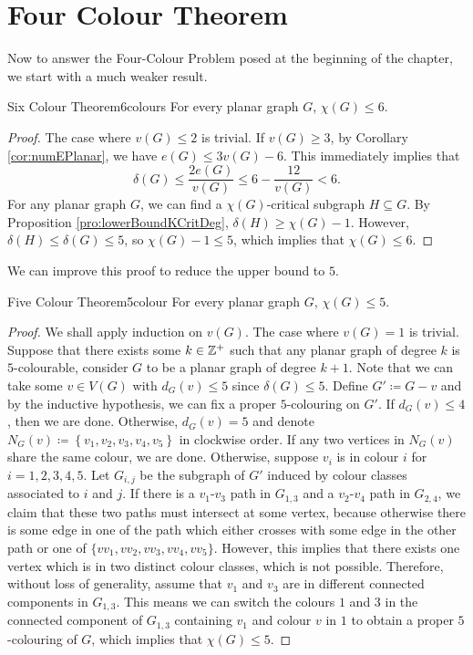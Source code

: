 \documentclass[math, code]{amznotes}
\theoremstyle{remark}
\begin{document}
\section{Four Colour Theorem}
Now to answer the Four-Colour Problem posed at the beginning of the chapter, we start with a much weaker result.
\begin{thmbox}{Six Colour Theorem}{6colours}
    For every planar graph $G$, $\chi(G) \leq 6$.
    \tcblower
    \begin{proof}
        The case where $v(G) \leq 2$ is trivial. If $v(G) \geq 3$, by Corollary \ref{cor:numEPlanar}, we have $e(G) \leq 3v(G) - 6$. This immediately implies that 
        \begin{equation*}
            \delta(G) \leq \frac{2e(G)}{v(G)} \leq 6 - \frac{12}{v(G)} < 6.
        \end{equation*}
        For any planar graph $G$, we can find a $\chi(G)$-critical subgraph $H \subseteq G$. By Proposition \ref{pro:lowerBoundKCritDeg}, $\delta(H) \geq \chi(G) - 1$. However, $\delta(H) \leq \delta(G) \leq 5$, so $\chi(G) - 1 \leq 5$, which implies that $\chi(G) \leq 6$.
    \end{proof}
\end{thmbox}
We can improve this proof to reduce the upper bound to $5$.
\begin{thmbox}{Five Colour Theorem}{5colour}
    For every planar graph $G$, $\chi(G) \leq 5$.
    \tcblower
    \begin{proof}
        We shall apply induction on $v(G)$. The case where $v(G) = 1$ is trivial. Suppose that there exists some $k \in \mathbb{Z}^+$ such that any planar graph of degree $k$ is $5$-colourable, consider $G$ to be a planar graph of degree $k + 1$. Note that we can take some $v \in V(G)$ with $d_G(v) \leq 5$ since $\delta(G) \leq 5$. Define $G' \coloneqq G - v$ and by the inductive hypothesis, we can fix a proper $5$-colouring on $G'$. If $d_G(v) \leq 4$, then we are done. Otherwise, $d_G(v) = 5$ and denote $N_G(v) \coloneqq \left\{v_1, v_2, v_3, v_4, v_5\right\}$ in clockwise order. If any two vertices in $N_G(v)$ share the same colour, we are done. Otherwise, suppose $v_i$ is in colour $i$ for $i = 1, 2, 3, 4, 5$. Let $G_{i, j}$ be the subgraph of $G'$ induced by colour classes associated to $i$ and $j$. If there is a $v_1$-$v_3$ path in $G_{1, 3}$ and a $v_2$-$v_4$ path in $G_{2, 4}$, we claim that these two paths must intersect at some vertex, because otherwise there is some edge in one of the path which either crosses with some edge in the other path or one of $\{vv_1, vv_2, vv_3, vv_4, vv_5\}$. However, this implies that there exists one vertex which is in two distinct colour classes, which is not possible. Therefore, without loss of generality, assume that $v_1$ and $v_3$ are in different connected components in $G_{1, 3}$. This means we can switch the colours $1$ and $3$ in the connected component of $G_{1, 3}$ containing $v_1$ and colour $v$ in $1$ to obtain a proper $5$-colouring of $G$, which implies that $\chi(G) \leq 5$.
    \end{proof}
\end{thmbox}
\end{document}
